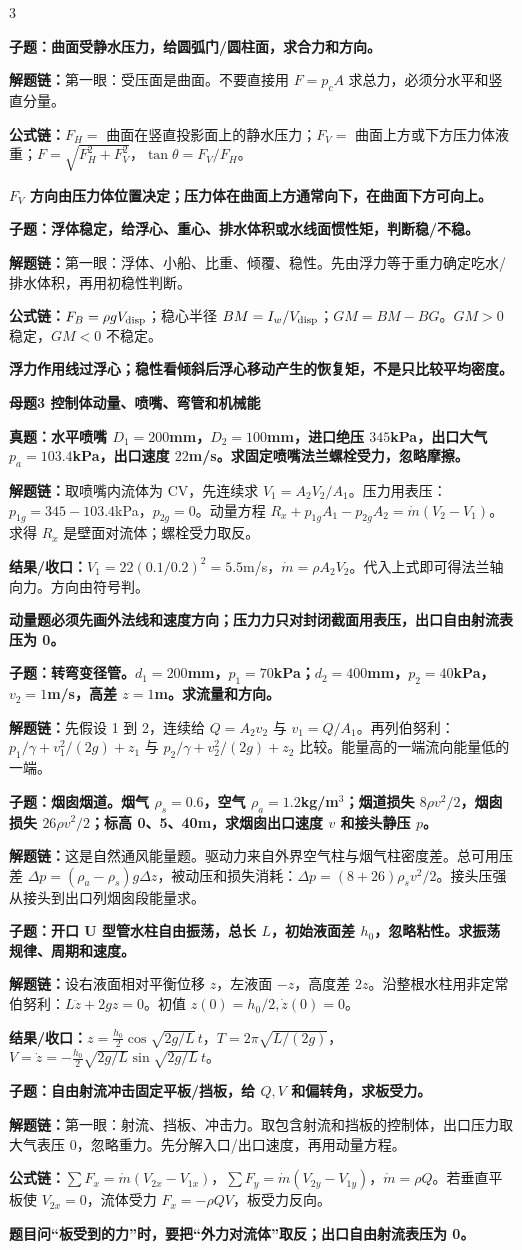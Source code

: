 \documentclass[a4paper]{article}
\newcommand{\mt}[1]{\vspace{2pt}\colorbox{M}{\parbox{\dimexpr\linewidth-2\fboxsep}{\color{white}\bfseries #1}}\par}
\newcommand{\qt}[1]{\vspace{1pt}\colorbox{Q}{\parbox{\dimexpr\linewidth-2\fboxsep}{\color{white}\bfseries #1}}\par}
\newcommand{\warn}[1]{\colorbox{Y}{\parbox{\dimexpr\linewidth-2\fboxsep}{\color{E}\bfseries #1}}\par}
\newcommand{\chain}[1]{{\color{A}\bfseries 解题链：}#1\par}
\newcommand{\res}[1]{{\color{E}\bfseries 结果/收口：}#1\par}
\newcommand{\form}[1]{{\color{M}\bfseries 公式链：}#1\par}
\begin{document}
\begin{multicols}{3}
\qt{子题：曲面受静水压力，给圆弧门/圆柱面，求合力和方向。}
\chain{第一眼：受压面是曲面。不要直接用 $F=p_cA$ 求总力，必须分水平和竖直分量。}
\form{$F_H=$ 曲面在竖直投影面上的静水压力；$F_V=$ 曲面上方或下方压力体液重；$F=\sqrt{F_H^2+F_V^2}$，$\tan\theta=F_V/F_H$。}
\warn{$F_V$ 方向由压力体位置决定；压力体在曲面上方通常向下，在曲面下方可向上。}

\qt{子题：浮体稳定，给浮心、重心、排水体积或水线面惯性矩，判断稳/不稳。}
\chain{第一眼：浮体、小船、比重、倾覆、稳性。先由浮力等于重力确定吃水/排水体积，再用初稳性判断。}
\form{$F_B=\rho gV_{\rm disp}$；稳心半径 $BM=I_w/V_{\rm disp}$；$GM=BM-BG$。$GM>0$ 稳定，$GM<0$ 不稳定。}
\warn{浮力作用线过浮心；稳性看倾斜后浮心移动产生的恢复矩，不是只比较平均密度。}

\mt{母题3 控制体动量、喷嘴、弯管和机械能}
\qt{真题：水平喷嘴 $D_1=200$mm，$D_2=100$mm，进口绝压 $345$kPa，出口大气 $p_a=103.4$kPa，出口速度 $22$m/s。求固定喷嘴法兰螺栓受力，忽略摩擦。}
\chain{取喷嘴内流体为 CV，先连续求 $V_1=A_2V_2/A_1$。压力用表压：$p_{1g}=345-103.4$kPa，$p_{2g}=0$。动量方程 $R_x+p_{1g}A_1-p_{2g}A_2=\dot m(V_2-V_1)$。求得 $R_x$ 是壁面对流体；螺栓受力取反。}
\res{$V_1=22(0.1/0.2)^2=5.5$m/s，$\dot m=\rho A_2V_2$。代入上式即可得法兰轴向力。方向由符号判。}
\warn{动量题必须先画外法线和速度方向；压力力只对封闭截面用表压，出口自由射流表压为 0。}

\qt{子题：转弯变径管。$d_1=200$mm，$p_1=70$kPa；$d_2=400$mm，$p_2=40$kPa，$v_2=1$m/s，高差 $z=1$m。求流量和方向。}
\chain{先假设 1 到 2，连续给 $Q=A_2v_2$ 与 $v_1=Q/A_1$。再列伯努利：$p_1/\gamma+v_1^2/(2g)+z_1$ 与 $p_2/\gamma+v_2^2/(2g)+z_2$ 比较。能量高的一端流向能量低的一端。}

\qt{子题：烟囱烟道。烟气 $\rho_s=0.6$，空气 $\rho_a=1.2$kg/m$^3$；烟道损失 $8\rho v^2/2$，烟囱损失 $26\rho v^2/2$；标高 0、5、40m，求烟囱出口速度 $v$ 和接头静压 $p$。}
\chain{这是自然通风能量题。驱动力来自外界空气柱与烟气柱密度差。总可用压差 $\Delta p=(\rho_a-\rho_s)g\Delta z$，被动压和损失消耗：$\Delta p=(8+26)\rho_s v^2/2$。接头压强从接头到出口列烟囱段能量求。}

\qt{子题：开口 U 型管水柱自由振荡，总长 $L$，初始液面差 $h_0$，忽略粘性。求振荡规律、周期和速度。}
\chain{设右液面相对平衡位移 $z$，左液面 $-z$，高度差 $2z$。沿整根水柱用非定常伯努利：$L\ddot z+2gz=0$。初值 $z(0)=h_0/2,\dot z(0)=0$。}
\res{$z=\frac{h_0}{2}\cos\sqrt{2g/L}\,t$，$T=2\pi\sqrt{L/(2g)}$，$V=\dot z=-\frac{h_0}{2}\sqrt{2g/L}\sin\sqrt{2g/L}\,t$。}

\qt{子题：自由射流冲击固定平板/挡板，给 $Q,V$ 和偏转角，求板受力。}
\chain{第一眼：射流、挡板、冲击力。取包含射流和挡板的控制体，出口压力取大气表压 0，忽略重力。先分解入口/出口速度，再用动量方程。}
\form{$\sum F_x=\dot m(V_{2x}-V_{1x})$，$\sum F_y=\dot m(V_{2y}-V_{1y})$，$\dot m=\rho Q$。若垂直平板使 $V_{2x}=0$，流体受力 $F_x=-\rho QV$，板受力反向。}
\warn{题目问“板受到的力”时，要把“外力对流体”取反；出口自由射流表压为 0。}


\end{multicols}
\end{document}
